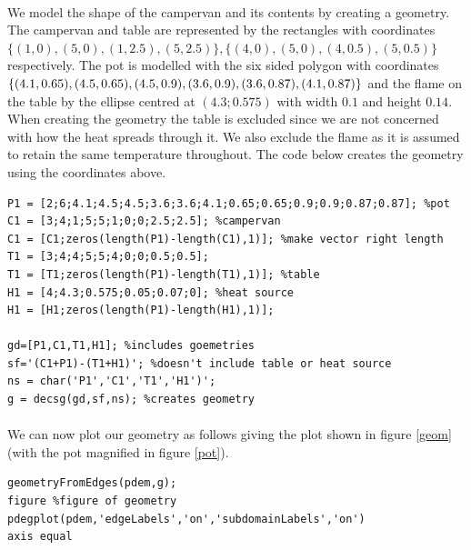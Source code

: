 \documentclass[12pt]{article}  %
\begin{document}
\paragraph{} We model the shape of the campervan and its contents by creating a geometry. The campervan and table are represented by the rectangles with coordinates $\{(1,0), (5,0), (1,2.5), (5,2.5)\}, \{(4,0), (5,0), (4,0.5), (5,0.5)\}$  respectively. The pot is modelled with the six sided polygon with coordinates $\{(4.1,0.65),(4.5,0.65),\\(4.5,0.9),(3.6,0.9),(3.6,0.87),(4.1,0.87)\}$ and the flame on the table by the ellipse centred at $(4.3;0.575)$ with width $0.1$ and height $0.14$. When creating the geometry the table is excluded since we are not concerned with how the heat spreads through it. We also exclude the flame as it is assumed to retain the same temperature throughout. The code below creates the geometry using the coordinates above.
\begin{lstlisting}
P1 = [2;6;4.1;4.5;4.5;3.6;3.6;4.1;0.65;0.65;0.9;0.9;0.87;0.87]; %pot
C1 = [3;4;1;5;5;1;0;0;2.5;2.5]; %campervan
C1 = [C1;zeros(length(P1)-length(C1),1)]; %make vector right length
T1 = [3;4;4;5;5;4;0;0;0.5;0.5];
T1 = [T1;zeros(length(P1)-length(T1),1)]; %table
H1 = [4;4.3;0.575;0.05;0.07;0]; %heat source
H1 = [H1;zeros(length(P1)-length(H1),1)];

gd=[P1,C1,T1,H1]; %includes goemetries
sf='(C1+P1)-(T1+H1)'; %doesn't include table or heat source
ns = char('P1','C1','T1','H1')';
g = decsg(gd,sf,ns); %creates geometry
\end{lstlisting}

\paragraph{} We can now plot our geometry as follows giving the plot shown in figure \ref{geom} (with the pot magnified in figure \ref{pot}).

\begin{lstlisting}
geometryFromEdges(pdem,g); 
figure %figure of geometry
pdegplot(pdem,'edgeLabels','on','subdomainLabels','on') 
axis equal
\end{lstlisting}
\end{document}
